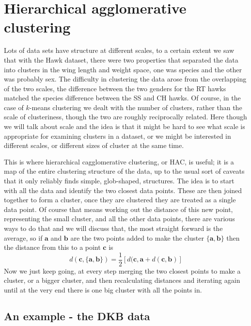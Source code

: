 \documentclass[12pt]{article}
\begin{document}
\section*{Hierarchical agglomerative clustering}

Lots of data sets have structure at different scales, to a certain
extent we saw that with the Hawk dataset, there were two properties
that separated the data into clusters in the wing length and weight
space, one was species and the other was probably sex. The difficulty
in clustering the data arose from the overlapping of the two scales,
the difference between the two genders for the RT hawks matched the
species difference between the SS and CH hawks. Of course, in the case
of $k$-means clustering we dealt with the number of clusters, rather
than the scale of clusteriness, though the two are roughly
reciprocally related. Here though we will talk about scale and the
idea is that it might be hard to see what scale is appropriate for
examining clusters in a dataset, or we might be interested in
different scales, or different sizes of cluster at the same time.

This is where hierarchical cagglomerative clustering, or HAC, is
useful; it is a map of the entire clustering structure of the data, up
to the usual sort of caveats that it only reliably finds simple,
glob-shaped, structures. The idea is to start with all the data and
identify the two closest data points. These are then joined together
to form a cluster, once they are clustered they are treated as a
single data point. Of course that means working out the distance of
this new point, representing the small cluster, and all the other data
points, there are various ways to do that and we will discuss that,
the most straight forward is the average, so if $\mathbf{a}$ and
$\mathbf{b}$ are the two points added to make the cluster
$\{\mathbf{a},\mathbf{b}\}$ then the distance from this to a point
$\mathbf{c}$ is
\begin{equation}
  d(\mathbf{c},\{\mathbf{a},\mathbf{b}\})=\frac{1}{2}[d(\mathbf{c},\mathbf{a}+d(\mathbf{c},\mathbf{b})]
\end{equation}
Now we just keep going, at every step merging the two closest points
to make a cluster, or a bigger cluster, and then recalculating
distances and iterating again until at the very end there is one big
cluster with all the points in.

\subsection*{An example - the DKB data}
\end{document}
